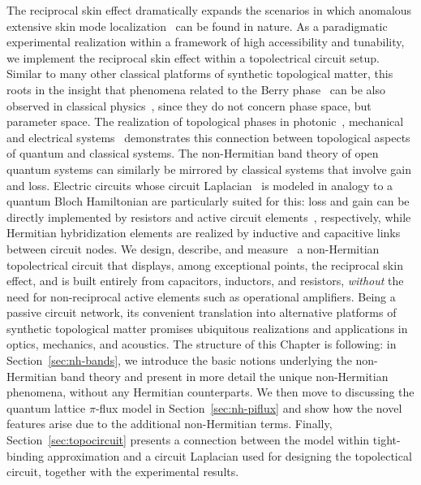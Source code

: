 The reciprocal skin effect dramatically expands the scenarios in which anomalous extensive skin mode localization~\cite{PhysRevB.99.201103} can be found in nature. As a paradigmatic experimental realization within a framework of high accessibility and tunability, we implement the reciprocal skin effect within a topolectrical circuit setup. Similar to many other classical platforms of synthetic topological matter, this roots in the insight that phenomena related to the Berry phase~\cite{berry84,ZakPhase2} can be also observed in classical physics~\cite{Haldane:86}, since they do not concern phase space, but parameter space. The realization of topological phases in photonic~\cite{PhysRevLett.100.013904}, mechanical~\cite{lubensky,PhysRevLett.114.114301} and electrical systems~\cite{ningyuan2015time,PhysRevLett.114.173902,hu2015measurement,LeeTopolectrical18,imhof,PhysRevLett.122.247702,knots,LeeTopolectrical18,interf-nh-ezawa,nh-haldane-ezawa,wang2019topologically} demonstrates this connection between topological aspects of quantum and classical systems. The non-Hermitian band theory of open quantum systems can similarly be mirrored by classical systems that involve gain and loss. Electric circuits whose circuit Laplacian~\cite{LeeTopolectrical18} is modeled in analogy to a quantum Bloch Hamiltonian are particularly suited for this: loss and gain can be directly implemented by resistors and active circuit elements~\cite{PhysRevLett.122.247702}, respectively, while Hermitian hybridization elements are realized by inductive and capacitive links between circuit nodes.  We design, describe, and measure~\cite{PhysRevB.99.161114} a non-Hermitian topolectrical circuit that displays, among exceptional points, the reciprocal skin effect, and is built entirely from capacitors, inductors, and resistors, \emph{without} the need for non-reciprocal active elements such as operational amplifiers. Being a passive circuit network, its convenient translation into alternative platforms of synthetic topological matter promises ubiquitous realizations and applications in optics, mechanics, and acoustics. The structure of this Chapter is following: in Section~\ref{sec:nh-bands}, we introduce the basic notions underlying the non-Hermitian band theory and present in more detail the unique non-Hermitian phenomena, without any Hermitian counterparts. We then move to discussing the quantum lattice $\pi$-flux model in Section~\ref{sec:nh-piflux} and show how the novel features arise due to the additional non-Hermitian terms. Finally, Section~\ref{sec:topocircuit} presents a connection between the model within tight-binding approximation and a circuit Laplacian used for designing the topolectical circuit, together with the experimental results.

